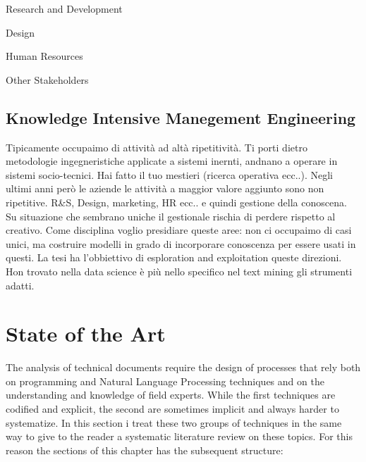 \documentclass[]{book}
\begin{document}
Research and Development

Design

Human Resources

Other Stakeholders

\section{Knowledge Intensive Manegement
Engineering}\label{knowledge-intensive-manegement-engineering}

Tipicamente occupaimo di attività ad altà ripetitività. Ti porti dietro
metodologie ingegneristiche applicate a sistemi inernti, andnano a
operare in sistemi socio-tecnici. Hai fatto il tuo mestieri (ricerca
operativa ecc..). Negli ultimi anni però le aziende le attività a
maggior valore aggiunto sono non ripetitive. R\&S, Design, marketing, HR
ecc.. e quindi gestione della conoscena. Su situazione che sembrano
uniche il gestionale rischia di perdere rispetto al creativo. Come
disciplina voglio presidiare queste aree: non ci occupaimo di casi
unici, ma costruire modelli in grado di incorporare conoscenza per
essere usati in questi. La tesi ha l'obbiettivo di esploration and
exploitation queste direzioni. Hon trovato nella data science è più
nello specifico nel text mining gli strumenti adatti.

\chapter{State of the Art}\label{sota}

The analysis of technical documents require the design of processes that
rely both on programming and Natural Language Processing techniques and
on the understanding and knowledge of field experts. While the first
techniques are codified and explicit, the second are sometimes implicit
and always harder to systematize. In this section i treat these two
groups of techniques in the same way to give to the reader a systematic
literature review on these topics. For this reason the sections of this
chapter has the subsequent structure:
\end{document}
